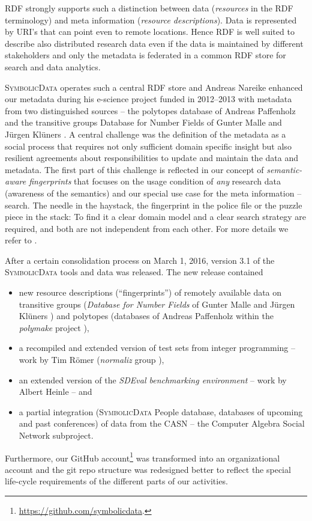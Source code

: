\documentclass[a4paper,11pt]{article}
\def\SD{\textsc{SymbolicData}}
\begin{document}
RDF strongly supports such a distinction between data (\emph{resources} in the
RDF terminology) and meta information (\emph{resource descriptions}). Data is
represented by URI's that can point even to remote locations.  Hence RDF is
well suited to describe also distributed research data even if the data is
maintained by different stakeholders and only the metadata is federated in a
common RDF store for search and data analytics.

{\SD} operates such a central RDF store \cite{sdstore} and Andreas Nareike
enhanced our metadata during his e-science project funded in 2012--2013 with
metadata from two distinguished sources -- the polytopes database of Andreas
Paffenholz \cite{Paffenholz} and the transitive groups Database for Number
Fields of Gunter Malle and J\"urgen Kl\"uners \cite{MalleKlueners}.  A central
challenge was the definition of the metadata as a social process that requires
not only sufficient domain specific insight but also resilient agreements about
responsibilities to update and maintain the data and metadata.  The first part
of this challenge is reflected in our concept of \emph{semantic-aware
  fingerprints} that focuses on the usage condition of \emph{any} research data
(awareness of the semantics) and our special use case for the meta information
-- search. The needle in the haystack, the fingerprint in the police file or
the puzzle piece in the stack: To find it a clear domain model and a clear
search strategy are required, and both are not independent from each other.
For more details we refer to \cite{icms-16}.

After a certain consolidation process on March 1, 2016, version 3.1 of the
{\SD} tools and data was released. The new release contained
\begin{itemize}
\item new resource descriptions (``fingerprints'') of remotely available data
  on transitive groups (\emph{Database for Number Fields} of Gunter Malle and
  J\"urgen Kl\"uners \cite{MalleKlueners}) and polytopes (databases of Andreas
  Paffenholz \cite{Paffenholz} within the \emph{polymake} project
  \cite{polymake}),
\item a recompiled and extended version of test sets from integer programming
  -- work by Tim R\"omer (\emph{normaliz} group \cite{normaliz}), 
\item an extended version of the \emph{SDEval benchmarking environment} -- work
  by Albert Heinle \cite{heinle-15} -- and
\item a partial integration ({\SD} People database, databases of upcoming and
  past conferences) of data from the CASN -- the Computer Algebra Social
  Network subproject.
\end{itemize}
Furthermore, our GitHub
account\footnote{\url{https://github.com/symbolicdata}.} was transformed into
an organizational account and the git repo structure was redesigned better to
reflect the special life-cycle requirements of the different parts of our
activities.
\end{document}
